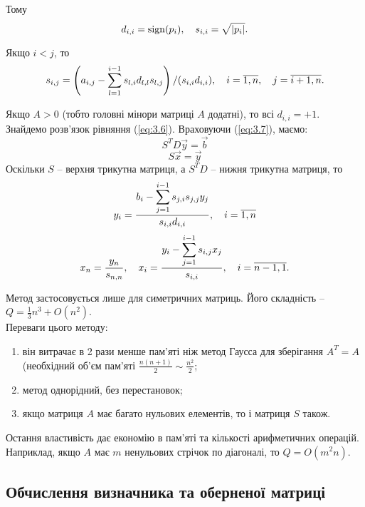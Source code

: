 Тому \[ d_{i,i} = \operatorname{sign} (p_i), \quad s_{i,i} = \sqrt{|p_i|}. \]

Якщо $i < j$, то \[ s_{i,j} = \left( a_{i,j} - \displaystyle\sum\limits_{l=1}^{i-1} s_{l,i} d_{l,l} s_{l,j} \right) / (s_{i,i} d_{i,i}), \quad i = \overline{1, n}, \quad j = \overline{i+1, n}. \]

Якщо $A > 0$ (тобто головні мінори матриці $A$ додатні), то всі $d_{i,i} = +1$. \\

Знайдемо розв’язок рівняння (\ref{eq:3.6}). Враховуючи (\ref{eq:3.7}), маємо:
\begin{equation}
	\label{eq:3.9}
	S^T D \vec y = \vec b
\end{equation}
\begin{equation}
	\label{eq:3.10}
	S \vec x = \vec y
\end{equation}
Оскільки $S$ -- верхня трикутна матриця, а $S^TD$ -- нижня трикутна матриця, то
\begin{equation}
	\label{eq:3.11}
	y_i = \dfrac{b_i - \displaystyle\sum\limits_{j=1}^{i-1} s_{j,i}s_{j,j}y_j}{s_{i,i}d_{i,i}}, \quad i=\overline{1,n}
\end{equation}
\begin{equation}
	\label{eq:3.12}
	x_n = \dfrac{y_n}{s_{n,n}}, \quad x_i = \dfrac{y_i - \displaystyle\sum\limits_{j=1}^{i-1} s_{i,j} x_j}{s_{i,i}}, \quad i=\overline{n-1,1}.
\end{equation}

Метод застосовується лише для симетричних матриць. Його складність -- $Q = \frac13 n^3 + O(n^2)$. \\

Переваги цього методу:
\begin{enumerate}
	\item він витрачає в 2 рази менше пам'яті ніж метод Гаусса для зберігання $A^T = A$ (необхідний об'єм пам'яті $\frac{n(n+1)}{2} \sim \frac{n^2}{2}$;
	\item метод однорідний, без перестановок;
	\item якщо матриця $A$ має багато нульових елементів, то і матриця $S$ також.
\end{enumerate}
Остання властивість дає економію в пам'яті та кількості арифметичних операцій. Наприклад, якщо $A$ має $m$ ненульових стрічок по діагоналі, то $Q = O(m^2n)$.

\subsection{Обчислення визначника та оберненої матриці}

